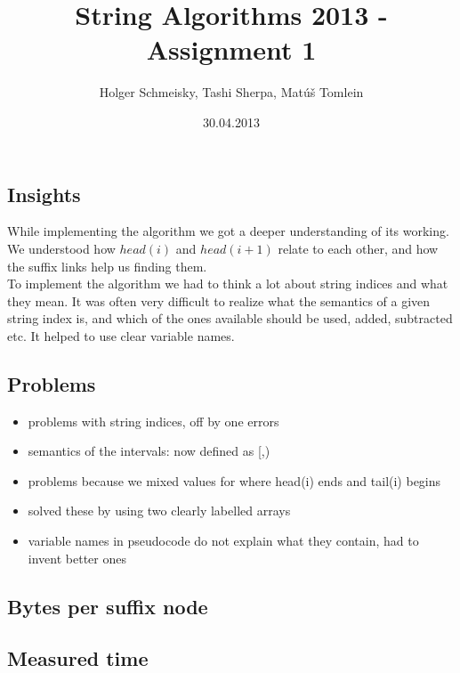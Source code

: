 \documentclass[a4paper,10pt]{article}
\title{String Algorithms 2013 - Assignment 1}
\author{Holger Schmeisky, Tashi Sherpa, Matúš Tomlein}
\date{30.04.2013}
\begin{document}
\maketitle

\subsection*{Insights}
While implementing the algorithm we got a deeper understanding of its working. We understood how $head(i)$ and $head(i+1)$ relate to each other, and how the suffix links help us finding them.\\
To implement the algorithm we had to think a lot about string indices and what they mean. It was often very difficult to realize what the semantics of a given string index is, and which of the ones available should be used, added, subtracted etc. It helped to use clear variable names.

\subsection*{Problems}
\begin{itemize}
  \item problems with string indices, off by one errors
  \item semantics of the intervals: now defined as [,)
  \item problems because we mixed values for where head(i) ends and tail(i) begins
  \item solved these by using two clearly labelled arrays
  \item variable names in pseudocode do not explain what they contain, had to invent better ones
\end{itemize}

\subsection*{Bytes per suffix node}

\subsection*{Measured time}
\end{document}
